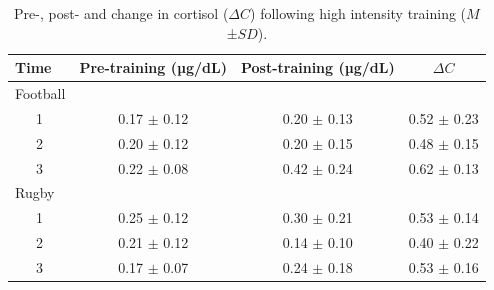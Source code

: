 \documentclass[man,floatsintext]{apa6}
\begin{document}
\begin{table}[H]

\begin{center}
\begin{threeparttable}

\caption{\label{tab:cortchange}Pre-, post- and change in cortisol ($\Delta C$) following high intensity training ($M$ ±$SD$).}

\begin{tabular}{lccc}
\toprule
Time & Pre-training (µg/dL) & Post-training (µg/dL) & $\Delta C$\\
\midrule
Football &  &  & \\
\ \ \ 1 & 0.17 $\pm$ 0.12 & 0.20 $\pm$ 0.13 & 0.52 $\pm$ 0.23\\
\ \ \ 2 & 0.20 $\pm$ 0.12 & 0.20 $\pm$ 0.15 & 0.48 $\pm$ 0.15\\
\ \ \ 3 & 0.22 $\pm$ 0.08 & 0.42 $\pm$ 0.24 & 0.62 $\pm$ 0.13\\
Rugby &  &  & \\
\ \ \ 1 & 0.25 $\pm$ 0.12 & 0.30 $\pm$ 0.21 & 0.53 $\pm$ 0.14\\
\ \ \ 2 & 0.21 $\pm$ 0.12 & 0.14 $\pm$ 0.10 & 0.40 $\pm$ 0.22\\
\ \ \ 3 & 0.17 $\pm$ 0.07 & 0.24 $\pm$ 0.18 & 0.53 $\pm$ 0.16\\
\bottomrule
\end{tabular}

\end{threeparttable}
\end{center}

\end{table}
\end{document}
